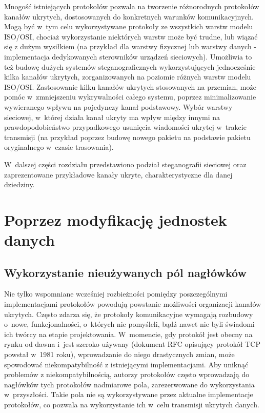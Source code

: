 \documentclass[a4paper, twoside, 12pt]{report}
\begin{document}
    Mnogość istniejących protokołów pozwala na tworzenie różnorodnych protokołów
    kanałów ukrytych, dostosowanych do konkretnych warunków komunikacyjnych.
    Mogą być w~tym celu wykorzystywane protokoły ze wszystkich warstw modelu
    ISO/OSI, chociaż wykorzystanie niektórych warstw może być trudne, lub wiązać
    się z dużym wysiłkiem (na przykład dla warstwy fizycznej lub warstwy danych -
    implementacja dedykowanych sterowników urządzeń sieciowych). Umożliwia to
    też budowę dużych systemów steganograficznych wykorzystujących jednocześnie
    kilka kanałów ukrytych, zorganizowanych na poziomie różnych warstw modelu ISO/OSI.
    Zastosowanie kilku kanałów ukrytych stosowanych na przemian, może pomóc w~zmniejszeniu
    wykrywalności całego systemu, poprzez minimalizowanie wywieranego wpływu na pojedynczy
    kanał podstawowy. Wybór warstwy sieciowej, w~której działa kanał ukryty
    ma wpływ między innymi na prawdopodobieństwo przypadkowego usunięcia wiadomości
    ukrytej w~trakcie transmisji (na przykład poprzez budowę nowego pakietu na podstawie
    pakietu oryginalnego w~czasie trasowania).

    W~dalszej części rozdziału przedstawiono podział steganografii sieciowej
    oraz zaprezentowane przykładowe kanały ukryte, charakterystyczne dla danej
    dziedziny.
    \section{Poprzez modyfikację jednostek danych} \label{MODYFIKACJAPAKIETOW}
        \subsection{Wykorzystanie nieużywanych pól nagłówków}
        Nie tylko wspomniane wcześniej rozbieżności pomiędzy poszczególnymi
        implementacjami protokołów powodują powstanie możliwości organizacji kanałów ukrytych.
        Często zdarza się, że protokoły komunikacyjne wymagają rozbudowy o~nowe,
        funkcjonalności, o~których nie pomyśleli, bądź nawet nie byli świadomi
        ich twórcy na etapie projektowania. W~momencie, gdy protokół jest obecny
        na rynku od dawna i~jest szeroko używany (dokument RFC opisujący protokół TCP
        powstał w~1981 roku\cite{TCPRFC}), wprowadzanie do niego drastycznych zmian,
        może spowodować niekompatybilność z istniejącymi implementacjami.
        Aby uniknąć problemów z niekompatybilnością, autorzy protokołów często wprowadzają
        do nagłówków tych protokołów nadmiarowe pola, zarezerwowane do wykorzystania
        w~przyszłości. Takie pola nie są wykorzystywane przez aktualne implementacje
        protokołów, co pozwala na wykorzystanie ich w~celu transmisji ukrytych danych.
\end{document}
